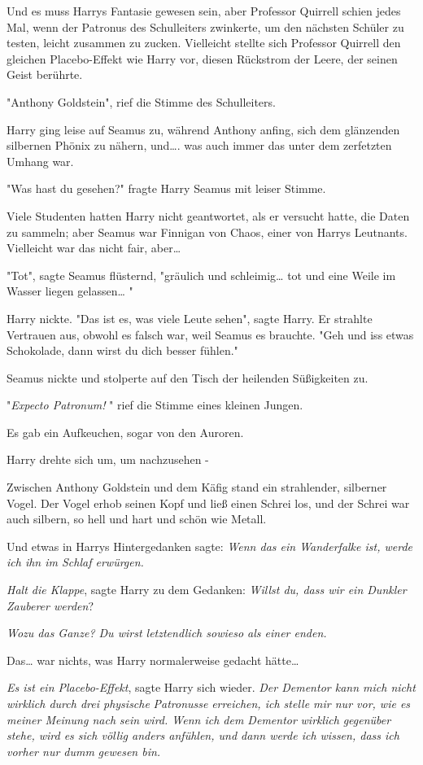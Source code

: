 {Und es muss Harrys Fantasie gewesen sein, aber Professor Quirrell schien jedes Mal, wenn der Patronus des Schulleiters zwinkerte, um den nächsten Schüler zu testen, leicht zusammen zu zucken. Vielleicht stellte sich Professor Quirrell den gleichen Placebo-Effekt wie Harry vor, diesen Rückstrom der Leere, der seinen Geist berührte.

"Anthony Goldstein", rief die Stimme des Schulleiters.

Harry ging leise auf Seamus zu, während Anthony anfing, sich dem glänzenden silbernen Phönix zu nähern, und…. was auch immer das unter dem zerfetzten Umhang war.

"Was hast du gesehen?" fragte Harry Seamus mit leiser Stimme.

Viele Studenten hatten Harry nicht geantwortet, als er versucht hatte, die Daten zu sammeln; aber Seamus war Finnigan von Chaos, einer von Harrys Leutnants. Vielleicht war das nicht fair, aber…

"Tot", sagte Seamus flüsternd, "gräulich und schleimig… tot und eine Weile im Wasser liegen gelassen… "

Harry nickte. "Das ist es, was viele Leute sehen", sagte Harry. Er strahlte Vertrauen aus, obwohl es falsch war, weil Seamus es brauchte. "Geh und iss etwas Schokolade, dann wirst du dich besser fühlen."

Seamus nickte und stolperte auf den Tisch der heilenden Süßigkeiten zu.

"\emph{Expecto Patronum!} " rief die Stimme eines kleinen Jungen.

Es gab ein Aufkeuchen, sogar von den Auroren.

Harry drehte sich um, um nachzusehen -

Zwischen Anthony Goldstein und dem Käfig stand ein strahlender, silberner Vogel. Der Vogel erhob seinen Kopf und ließ einen Schrei los, und der Schrei war auch silbern, so hell und hart und schön wie Metall.

Und etwas in Harrys Hintergedanken sagte: \emph{Wenn das ein Wanderfalke ist, werde ich ihn im Schlaf erwürgen.}

\emph{Halt die Klappe}, sagte Harry zu dem Gedanken: \emph{Willst du, dass wir ein Dunkler Zauberer werden}?

\emph{Wozu das Ganze? Du wirst letztendlich sowieso als einer enden.}

Das… war nichts, was Harry normalerweise gedacht hätte…

\emph{Es ist ein Placebo-Effekt}, sagte Harry sich wieder. \emph{Der Dementor kann mich nicht wirklich durch drei physische} \emph{Patronusse} \emph{erreichen, ich stelle mir nur vor, wie es meiner Meinung nach} \emph{sein wird. Wenn ich dem Dementor} \emph{wirklich} \emph{gegenüber stehe, wird es sich völlig anders anfühlen, und dann werde ich wissen, dass ich vorher nur dumm} \emph{gewesen bin.}

}
